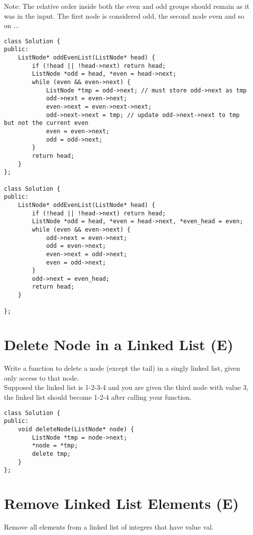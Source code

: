 Note:
The relative order inside both the even and odd groups should remain as it was in the input.
The first node is considered odd, the second node even and so on ... \\

\begin{lstlisting}
class Solution {
public:
    ListNode* oddEvenList(ListNode* head) {
        if (!head || !head->next) return head;
        ListNode *odd = head, *even = head->next;
        while (even && even->next) {
            ListNode *tmp = odd->next; // must store odd->next as tmp
            odd->next = even->next;
            even->next = even->next->next;
            odd->next->next = tmp; // update odd->next->next to tmp but not the current even
            even = even->next;
            odd = odd->next;
        }
        return head;
    }
};

class Solution {
public:
    ListNode* oddEvenList(ListNode* head) {
        if (!head || !head->next) return head;
        ListNode *odd = head, *even = head->next, *even_head = even;
        while (even && even->next) {
            odd->next = even->next;
            odd = even->next;
            even->next = odd->next;
            even = odd->next;
        }
        odd->next = even_head;
        return head;
    }

};
\end{lstlisting}


\section{Delete Node in a Linked List (E)}
Write a function to delete a node (except the tail) in a singly linked list, given only access to that node.\\

Supposed the linked list is 1-2-3-4 and you are given the third node with value 3, the linked list should become 1-2-4 after calling your function. \\

\begin{lstlisting}
class Solution {
public:
    void deleteNode(ListNode* node) {
        ListNode *tmp = node->next;
        *node = *tmp;
        delete tmp;
    }
};
\end{lstlisting} 


\section{Remove Linked List Elements (E)}
Remove all elements from a linked list of integers that have value val.\\

